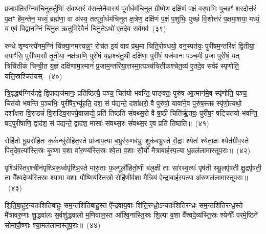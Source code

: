 {\anuvakamend[{षो॒ढा॒वि॒हि॒तो वै वै᳚ष्ण॒वीर॒न्यो विꣳ॑श॒तिश्च॑}]}

प्र॒जा\-प॑तिर॒ग्निम॑चिनुत॒र्तुभिः॑ संवथ्स॒रं व॑स॒न्तेनै॒वास्य॑ पूर्वा॒र्धम॑चिनुत ग्री॒ष्मेण॒ दक्षि॑णं प॒क्षं व॒र्॒\mbox{}षाभिः॒ पुच्छꣳ॑ श॒रदोत्त॑रं प॒क्षꣳ हे॑म॒न्तेन॒ मध्यं॒ ब्रह्म॑णा॒ वा अ॑स्य॒ तत्पू᳚र्वा॒र्धम॑चिनुत क्ष॒त्रेण॒ दक्षि॑णं प॒क्षं प॒शुभिः॒ पुच्छं॑ वि॒शोत्त॑रं प॒क्षमा॒शया॒ मध्यं॒ य ए॒वं वि॒द्वान॒ग्निं चि॑नु॒त ऋ॒तुभि॑रे॒वैनं॑ चिनु॒ते\-ऽथो॑ ए॒तदे॒व सर्व॒मव॑~(३९)\ip

रुन्धे शृ॒ण्वन्त्ये॑नम॒ग्निं चि॑क्या॒नमत्त्यन्न॒ꣳ॒ रोच॑त इ॒यं वाव प्र॑थ॒मा चिति॒रोष॑धयो॒ वन॒स्पत॑यः॒ पुरी॑षम॒न्तरि॑क्षं द्वि॒तीया॒ वयाꣳ॑सि॒ पुरी॑षम॒सौ तृ॒तीया॒ नक्ष॑त्राणि॒ पुरी॑षं य॒ज्ञश्च॑तु॒र्थी दक्षि॑णा॒ पुरी॑षं॒ यज॑मानः पञ्च॒मी प्र॒जा पुरी॑षं॒ यत् त्रिचि॑तीकं चिन्वी॒त य॒ज्ञं दक्षि॑णामा॒त्मानं॑ प्र॒जाम॒न्तरि॑या॒त्तस्मा॒त्पञ्च॑चितीकश्चेत॒व्य॑ ए॒तदे॒व सर्वꣴ॑ स्पृणोति॒ यत्ति॒स्रश्चित॑यस्-~(४०)\ip

त्रि॒वृद्ध्य॑ग्निर्यद्द्वे द्वि॒पाद्यज॑मानः॒ प्रति॑ष्ठित्यै॒ पञ्च॒ चित॑यो भवन्ति॒ पाङ्क्तः॒ पुरु॑ष आ॒त्मान॑मे॒व स्पृ॑णोति॒ पञ्च॒ चित॑यो भवन्ति प॒ञ्चभिः॒ पुरी॑षैर॒भ्यू॑हति॒ दश॒ सं प॑द्यन्ते॒ दशा᳚क्षरो॒ वै पुरु॑षो॒ यावा॑ने॒व पुरु॑ष॒स्तꣴ स्पृ॑णो॒त्यथो॒ दशा᳚क्षरा वि॒राडन्नं॑ वि॒राड्वि॒राज्ये॒वान्नाद्ये॒ प्रति॑ तिष्ठति संवथ्स॒रो वै ष॒ष्ठी चिति॑र्\mbox{}ऋ॒तवः॒ पुरी॑ष॒ꣳ॒ षट्चित॑यो भवन्ति॒ षट्पुरी॑षाणि॒ द्वाद॑श॒ सं प॑द्यन्ते॒ द्वाद॑श॒ मासाः᳚ संवथ्स॒रः सं॑वथ्स॒र ए॒व प्रति॑ तिष्ठति॥~(४१)\ip

{\anuvakamend[{अव॒ चित॑यः॒ पुरी॑षं॒ पञ्च॑दश च}]}%

रोहि॑तो धू॒म्ररो॑हितः क॒र्कन्धु॑रोहित॒स्ते प्रा॑जाप॒त्या ब॒भ्रुर॑रु॒णब॑भ्रुः॒ शुक॑बभ्रु॒स्ते रौ॒द्राः श्येतः॑ श्येता॒क्षः श्येत॑ग्रीव॒स्ते पि॑तृदेव॒त्या᳚स्ति॒स्रः कृ॒ष्णा व॒शा वा॑रु॒ण्य॑स्ति॒स्रः श्वे॒ता व॒शाः सौ॒र्यो॑ मैत्राबार्\mbox{}हस्प॒त्या धू॒म्रल॑लामास्तूप॒राः॥~(४२)\ip

{\anuvakamend[{}]}%

पृश्ञि॑स्तिर॒श्चीन॑पृश्ञिरू॒र्ध्वपृ॑श्ञि॒स्ते मा॑रु॒ताः फ॒ल्गूर्लो॑हितो॒र्णी ब॑ल॒क्षी ताः सा॑रस्व॒त्यः॑ पृष॑ती स्थू॒लपृ॑षती क्षु॒द्रपृ॑षती॒ ता वै᳚श्वदे॒व्य॑स्ति॒स्रः श्या॒मा व॒शाः पौ॒ष्णिय॑स्ति॒स्रो रोहि॑णीर्व॒शा मै॒त्रिय॑ ऐन्द्राबार्\mbox{}हस्प॒त्या अ॑रु॒णल॑लामास्तूप॒राः॥~(४३)\ip

{\anuvakamend[{रोहि॑तः॒ पृश्ञिः॒ षड्विꣳ॑शतिः॒ षड्विꣳ॑शतिः}]}%

शि॒ति॒बा॒हुर॒न्यतः॑शितिबाहुः सम॒न्तशि॑तिबाहु॒स्त ऐ᳚न्द्रवाय॒वाः शि॑ति॒रन्ध्रो॒\-ऽन्यतः॑शितिरन्ध्रः सम॒न्तशि॑तिरन्ध्र॒स्ते मै᳚त्रावरु॒णाः शु॒द्धवा॑लः स॒र्वशु॑द्धवालो म॒णिवा॑ल॒स्त आ᳚श्वि॒नास्ति॒स्रः शि॒ल्पा व॒शा वै᳚श्वदे॒व्य॑स्ति॒स्रः श्येनीः᳚ परमे॒ष्ठिने॑ सोमापौ॒ष्णाः श्या॒मल॑लामास्तूप॒राः॥~(४४)\ip

